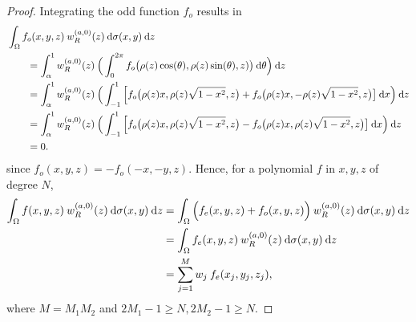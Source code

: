 \documentclass[11pt, oneside]{article}   	%
\newcommand{\genjac}{R}
\newcommand{\genjacw}{w_\genjac}
\begin{document}
\begin{proof}
Integrating the odd function $f_o$ results in
\begin{align*}
	&\int_\Omega f_o(x,y,z) \: \genjacw^{(a,0)}(z) \: \D \sigma(x,y) \: \D z \\
	&\quad \quad = \int_\alpha^1 \genjacw^{(a,0)}(z) \: \Big( \int_0^{2\pi} f_o\big(\rho(z)\cos(\theta),\rho(z)\sin(\theta), z)\big) \: \D \theta \Big) \: \D z \\
	&\quad \quad = \int_\alpha^1 \genjacw^{(a,0)}(z) \: \Big( \int_{-1}^1 \Big[ f_o\big(\rho(z)x,\rho(z)\sqrt{1-x^2}, z\big) + f_o\big(\rho(z)x, - \rho(z)\sqrt{1-x^2}, z\big) \big] \: \D x \Big) \: \D z \\
	&\quad \quad = \int_\alpha^1 \genjacw^{(a,0)}(z) \: \Big( \int_{-1}^1 \Big[ f_o\big(\rho(z)x,\rho(z)\sqrt{1-x^2}, z\big) - f_o\big(\rho(z)x, \rho(z)\sqrt{1-x^2}, z\big) \big] \: \D x \Big) \: \D z \\
	&\quad \quad = 0.
\end{align*}
since $f_o(x,y,z) = - f_o(-x, -y, z)$. Hence, for a polynomial $f$ in $x,y,z$ of degree $N$,
\begin{align*}
	\int_\Omega f(x,y,z) \: \genjacw^{(a,0)}(z) \: \D \sigma(x,y) \: \D z &= \int_\Omega \Big(f_e(x,y,z) + f_o(x,y,z)\Big) \:  \genjacw^{(a,0)}(z) \: \D \sigma(x,y) \: \D z  \\
	&= \int_\Omega f_e(x,y,z) \: \genjacw^{(a,0)}(z) \: \D \sigma(x,y) \: \D z \\
	&= \sum_{j=1}^{M}  w_j \: f_e(x_j, y_j, z_j),
\end{align*}
where $M = M_1 M_2$ and $2M_1 - 1 \ge N, 2M_2 - 1 \ge N$.
\end{proof}
\end{document}
